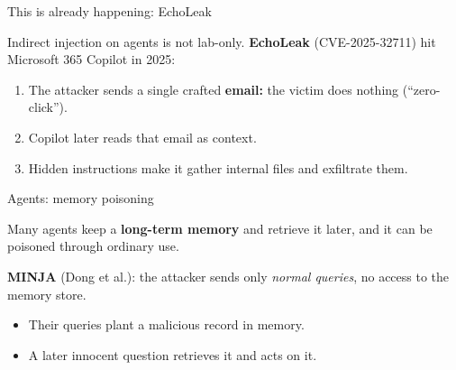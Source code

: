 \documentclass[12pt,aspectratio=169,handout]{beamer}
\begin{document}
\begin{frame}{This is already happening: EchoLeak}
Indirect injection on agents is not lab-only. \textbf{EchoLeak} (CVE-2025-32711) hit Microsoft 365 Copilot in 2025:
\begin{enumerate}
	\setlength{\itemsep}{0.1em}
	\item The attacker sends a single crafted \textbf{email:} the victim does nothing (``zero-click'').
	\item Copilot later reads that email as context.
	\item Hidden instructions make it gather internal files and \alert{exfiltrate} them.
\end{enumerate}


\end{frame}


\begin{frame}{Agents: memory poisoning}
Many agents keep a \textbf{long-term memory} and retrieve it later, and it can be poisoned through ordinary use.

\vspace{0.3em}
\textbf{MINJA} (Dong et al.): the attacker sends only \emph{normal queries}, no access to the memory store.
\begin{itemize}
	\item Their queries plant a malicious record in memory.
	\item A later innocent question retrieves it and acts on it.
\end{itemize}

\end{frame}
\end{document}
